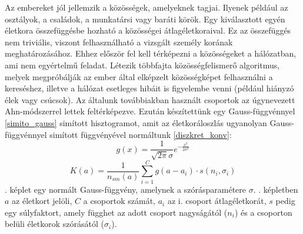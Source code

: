\documentclass[12pt]{article}
\begin{document}
Az embereket jól jellemzik a közösségek, amelyeknek tagjai. Ilyenek például az osztályok, a családok, a munkatársi vagy baráti körök. Egy kiválasztott egyén életkora összefüggésbe hozható a közösségei átlagéletkoraival. Ez az összefüggés nem triviális, viszont felhasználható a vizsgált személy korának meghatározásához. Ehhez először fel kell térképezni a közösségeket a hálózatban, ami nem egyértelmű feladat. Létezik \iffalse TODO: létezik helyett valami más szó \fi többfajta közösségfelismerő algoritmus, melyek megpróbálják az ember által elképzelt közösségképet felhasználni a kereséshez, illetve a hálózat esetleges hibáit is figyelembe venni (például hiányzó élek vagy csúcsok). Az általunk továbbiakban használt csoportok az úgynevezett Ahn-módszerrel \cite{tamas_gabor_tdk} \iffalse TODO: kell ez? \fi lettek feltérképezve. %
Ezután készítettünk egy Gauss-függvénnyel \eqref{simito_gauss} simított hisztogramot, amit az életkoráloszlás ugyanolyan Gauss-függvénnyel simított függvényével normáltunk \eqref{diszkret_konv}:
\begin{equation} \label{simito_gauss}
	g(x) = \frac{1}{\sqrt{2\pi}\sigma}e^{-\frac{x^2}{2\sigma^2}}
\end{equation}
\begin{equation} \label{diszkret_konv}
	K(a) = \frac{1}{n_{sm}(a)}\sum_{i=1}^{C} g(a-a_i) \cdot s(n_{i}, \sigma_{i}) %
\end{equation} %
. képlet egy normált Gauss-függvény, amelynek a szórásparamétere $\sigma$. . képletben $a$ az életkort jelöli, $C$ a csoportok számát, $a_i$ az i. csoport átlagéletkorát, $s$ pedig egy súlyfaktort, amely függhet az adott csoport nagyságától ($n_{i}$) és a csoporton belüli életkorok szórásától ($\sigma_i$).
\end{document}
